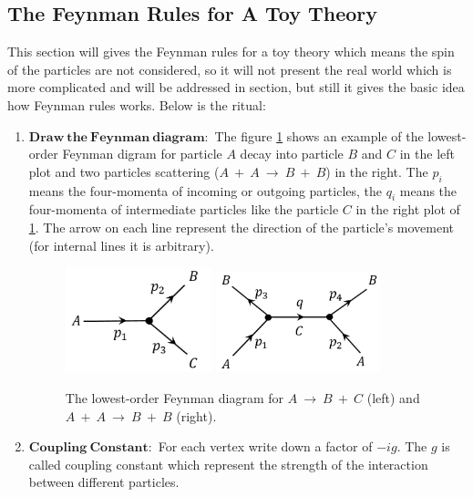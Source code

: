 \subsection{The Feynman Rules for A Toy Theory}\label{subsubsec:feynman_toy}
This section will gives the Feynman rules for a toy theory which means the spin of the particles are not considered, so it will not present the real world which is more complicated and will be addressed in section, but still it gives the basic idea how Feynman rules works. Below is the ritual:
\begin{enumerate}
\item $\mathbf{Draw~the~Feynman~diagram:}$ The figure \ref{fig:feynman_decay_scatter} shows an example of the lowest-order Feynman digram for particle $A$ decay into particle $B$ and $C$ in the left plot and two particles scattering ($A~+~A~\rightarrow~B~+~B$) in the right. The $p_{i}$ means the four-momenta of incoming or outgoing particles, the $q_{i}$ means the four-momenta of intermediate particles like the particle $C$ in the right plot of \ref{fig:feynman_decay_scatter}. The arrow on each line represent the direction of the particle's movement (for internal lines it is arbitrary).
\begin{figure}[h!]
 \begin{center}
\includegraphics[width=0.4\textwidth]{figures/theory/feynman_decay.png}
\includegraphics[width=0.45\textwidth]{figures/theory/feynman_scatter.png}
\caption{The lowest-order Feynman diagram for $A~\rightarrow~B~+~C$ (left) and $A~+~A~\rightarrow~B~+~B$ (right).}
  \label{fig:feynman_decay_scatter}
 \end{center}
\end{figure}
\item $\mathbf{Coupling~Constant:}$ For each vertex write down a factor of $-ig$. The $g$ is called coupling constant which represent the strength of the interaction between different particles.

\end{enumerate}
